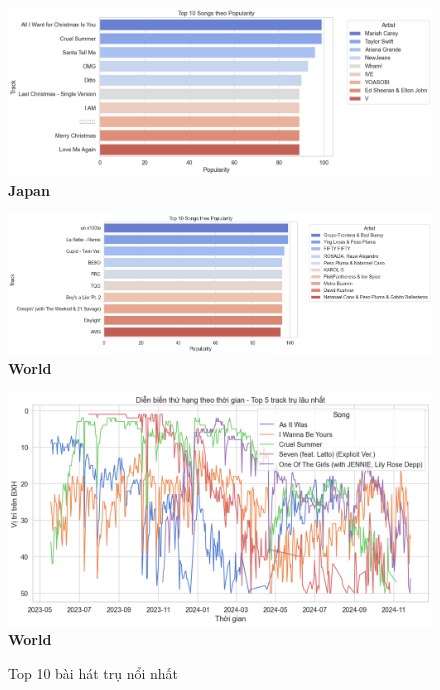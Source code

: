 \begin{itemize}
\begin{figure}[H]
        \vspace{0.4cm}

        \begin{minipage}{0.4\textwidth}
            \centering
            \includegraphics[width=\linewidth]{../graphics/data_top50/figure/2/EDA_japan.png}
            \\[4pt] {\small \textbf{Japan}}
        \end{minipage}
        \hfill
        \begin{minipage}{0.4\textwidth}
            \centering
            \includegraphics[width=\linewidth]{../graphics/data_top50/figure/2/EDA_world.png}
            \\[4pt] {\small \textbf{World}}
        \end{minipage}
        
        \caption{Top 10 bài hát trụ nổi nhất}
        \label{fig:energy-regions}

        \vspace{0.4cm}
        \begin{minipage}{1\textwidth}
            \centering
            \includegraphics[width=\linewidth]{../graphics/data_top50/figure/17/EDA_world.png}
            \\[4pt] {\small \textbf{World}}
        \end{minipage}
        

\end{figure}
\end{itemize}
